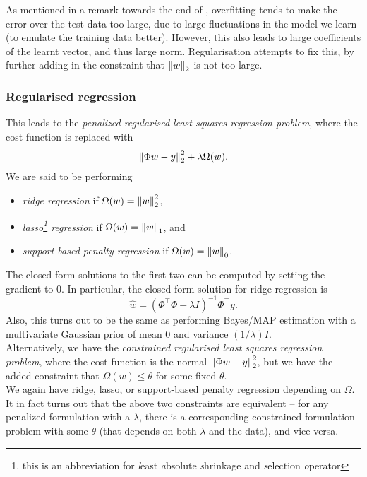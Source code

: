 \documentclass{article}
\begin{document}
		As mentioned in a remark towards the end of , overfitting tends to make the error over the test data too large, due to large fluctuations in the model we learn (to emulate the training data better). However, this also leads to large coefficients of the learnt vector, and thus large norm. Regularisation attempts to fix this, by further adding in the constraint that $\left\lVert w\right\rVert_2$ is not too large.

		\subsubsection{Regularised regression}

			This leads to the \emph{penalized regularised least squares regression problem}, where the cost function is replaced with
			\[ \left\lVert\Phi w - y\right\rVert_2^2 + \lambda\Omega(w). \]
			We are said to be performing
			\begin{itemize}
				\item \emph{ridge regression} if $\Omega(w) = \left\lVert w\right\rVert_2^2$,
				\item \emph{lasso\footnote{this is an abbreviation for \emph{l}east \emph{a}bsolute \emph{s}hrinkage and \emph{s}election \emph{o}perator} regression} if $\Omega(w) = \left\lVert w\right\rVert_1$, and
				\item \emph{support-based penalty regression} if $\Omega(w) = \left\lVert w\right\rVert_0$.
			\end{itemize}
			The closed-form solutions to the first two can be computed by setting the gradient to $0$. In particular, the closed-form solution for ridge regression is
			\[ \hat{w} = (\Phi^\top\Phi + \lambda I)^{-1} \Phi^\top y. \]
			Also, this turns out to be the same as performing Bayes/MAP estimation with a multivariate Gaussian prior of mean $0$ and variance $(1/\lambda)I$.\\

			Alternatively, we have the \emph{constrained regularised least squares regression problem}, where the cost function is the normal $\left\lVert\Phi w - y\right\rVert_2^2$, but we have the added constraint that $\Omega(w) \le \theta$ for some fixed $\theta$.\\
			We again have ridge, lasso, or support-based penalty regression depending on $\Omega$.\\
			It in fact turns out that the above two constraints are equivalent -- for any penalized formulation with a $\lambda$, there is a corresponding constrained formulation problem with some $\theta$ (that depends on both $\lambda$ and the data), and vice-versa.\\
\end{document}
